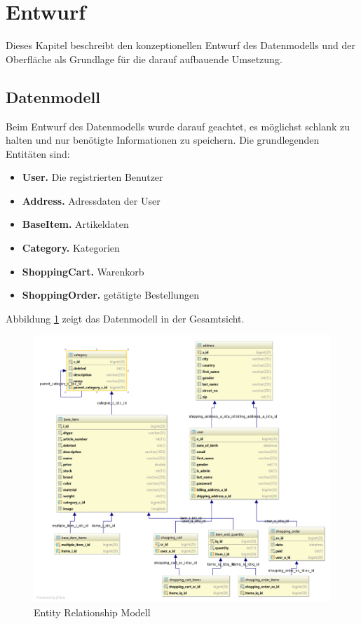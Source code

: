 \section{Entwurf}\label{outline} \thispagestyle{nomarkstyle}
Dieses Kapitel beschreibt den konzeptionellen Entwurf des Datenmodells und der Oberfläche als Grundlage für die darauf aufbauende Umsetzung.

\subsection{Datenmodell}\label{outline_datamodel}
Beim Entwurf des Datenmodells wurde darauf geachtet, es möglichst schlank zu halten und nur benötigte Informationen zu speichern.
Die grundlegenden Entitäten sind:
\begin{itemize}
\item\textbf{User.} Die registrierten Benutzer
\item\textbf{Address.} Adressdaten der User
\item\textbf{BaseItem.} Artikeldaten
\item\textbf{Category.} Kategorien
\item\textbf{ShoppingCart.} Warenkorb
\item\textbf{ShoppingOrder.} getätigte Bestellungen
\end{itemize}


Abbildung \ref{fig:ERM} zeigt das Datenmodell in der Gesamtsicht.
\begin{figure}[th!]
	\centering
	\includegraphics[width=\linewidth]{bilder/kap6/erm_diagram.png}
	\caption{Entity Relationship Modell}
	\label{fig:ERM}
\end{figure}

